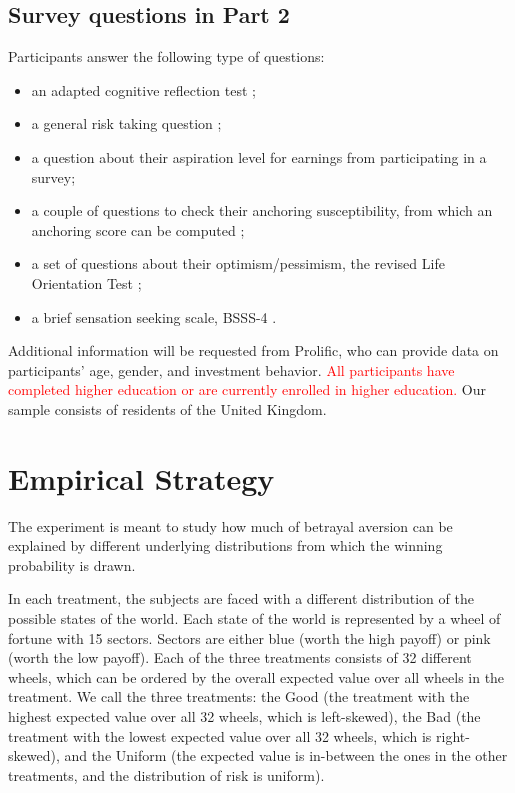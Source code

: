 \subsection{Survey questions in Part 2}
Participants answer the following type of questions:
\begin{itemize}
\item an adapted cognitive reflection test \citep{Frederick2005,Thomson2016};
\item a general risk taking question \citep{Dohmen2011};
\item a question about their aspiration level for earnings from participating in a survey;
\item a couple of questions to check their anchoring susceptibility, from which an anchoring score can be computed \citep{Cheek2017};
\item a set of questions about their optimism/pessimism, the revised Life Orientation Test \citep{Scheier1994};
\item a brief sensation seeking scale, BSSS-4 \citep{Stephenson2003}.
\end{itemize}

Additional information will be requested from Prolific, who can provide data on participants' age, gender, and investment behavior.
\textcolor{red}{All participants have completed higher education or are currently enrolled in higher education.}
Our sample consists of residents of the United Kingdom.



\section{Empirical Strategy}
The experiment is meant to study how much of betrayal aversion can be explained by different underlying distributions from which the winning probability is drawn.

In each treatment, the subjects are faced with a different distribution of the possible states of the world.
Each state of the world is represented by a wheel of fortune with 15 sectors.
Sectors are either blue (worth the high payoff) or pink (worth the low payoff).
Each of the three treatments consists of 32 different wheels, which can be ordered by the overall expected value over all wheels in the treatment.
We call the three treatments: the Good (the treatment with the highest expected value over all 32 wheels, which is left-skewed), the Bad (the treatment with the lowest expected value over all 32 wheels, which is right-skewed), and the Uniform (the expected value is in-between the ones in the other treatments, and the distribution of risk is uniform).

